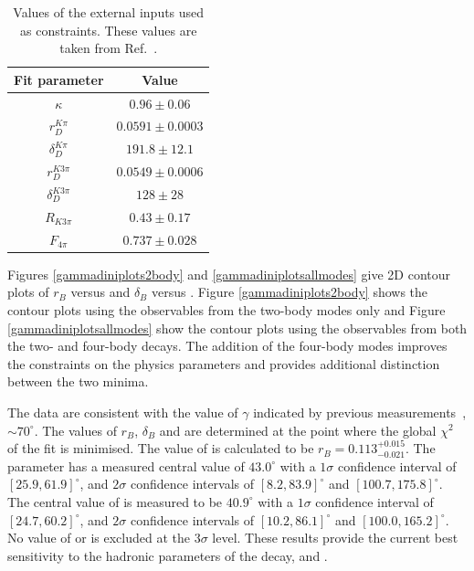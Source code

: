 \begin{table}
\centering
\begin{tabular}{cc}
Fit parameter & Value \\
\hline
$\kappa$ & $0.96 \pm 0.06$ \\
$r_D^{K\pi}$ & $0.0591 \pm 0.0003$ \\
$\delta_D^{K\pi}$ & $191.8 \pm 12.1$ \\
$r_D^{K3\pi}$ & $0.0549 \pm 0.0006$ \\
$\delta_D^{K3\pi}$ & $128 \pm 28$ \\
$R_{K3\pi}$ & $0.43 \pm 0.17$ \\
$F_{4\pi}$ & $0.737 \pm 0.028$
\end{tabular}
\caption{Values of the external inputs used as constraints. These values are taken from Ref.~\cite{HFAG,charmk3pi,charmk3pi_errata,charm4pi}.}
\label{inputparameters}
\end{table}

Figures \ref{gammadiniplots2body} and \ref{gammadiniplotsallmodes} give 2D contour plots of $r_B$ versus \Pgamma and $\delta_B$ versus \Pgamma. Figure \ref{gammadiniplots2body} shows the contour plots using the \CP observables from the two-body modes only and Figure \ref{gammadiniplotsallmodes} show the contour plots using the \CP observables from both the two- and four-body decays. The addition of the four-body modes improves the constraints on the physics parameters and provides additional distinction between the two minima. 

The data are consistent with the value of $\gamma$ indicated by previous measurements~\cite{LHCb-PAPER-2016-032, CKMFitter}, $\sim 70^\circ$. The values of $r_B$, $\delta_B$ and \Pgamma are determined at the point where the global $\chi^2$ of the fit is minimised. The value of \rb is calculated to be $r_B = 0.113^{+0.015}_{-0.021}$. The parameter \deltab has a measured central value of $43.0^{\circ}$ with a $1\sigma$ confidence interval of $[25.9, 61.9]^{\circ}$, and $2\sigma$ confidence intervals of $[8.2, 83.9]^{\circ}$ and $[100.7,175.8]^{\circ}$. The central value of \Pgamma is measured to be $40.9^{\circ}$ with a $1\sigma$ confidence interval of $[24.7, 60.2]^{\circ}$, and $2\sigma$ confidence intervals of $[10.2, 86.1]^{\circ}$ and $[100.0,165.2]^{\circ}$. No value of \Pgamma or \deltab is excluded at the $3\sigma$ level. These results provide the current best sensitivity to the hadronic parameters of the \Bm decay, \rb and \deltab.

